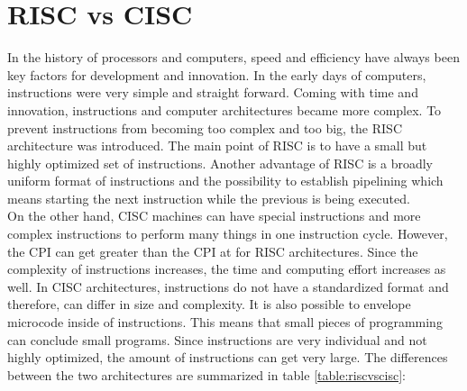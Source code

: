 \section{RISC vs CISC}
In the history of processors and computers, speed and efficiency have always been key factors for development and innovation. In the early days of computers, instructions were very simple and straight forward. Coming with time and innovation, instructions and computer architectures became more complex. To prevent instructions from becoming too complex and too big, the \acf{RISC} architecture was introduced. The main point of RISC is to have a small but highly optimized set of instructions. Another advantage of RISC is a broadly uniform format of instructions and the possibility to establish pipelining which means starting the next instruction while the previous is being executed.\\
On the other hand, \acf{CISC} machines can have special instructions and more complex instructions to perform many things in one instruction cycle. However, the CPI can get greater than the CPI at for RISC architectures. Since the complexity of instructions increases, the time and computing effort increases as well. In CISC architectures, instructions do not have a standardized format and therefore, can differ in size and complexity. It is also possible to envelope microcode inside of instructions. This means that small pieces of programming can conclude small programs. Since instructions are very individual and not highly optimized, the amount of instructions can get very large. The differences between the two architectures are summarized in table \ref{table:riscvscisc}:
\begin{table}[H]
	\setlength\arrayrulewidth{2pt}
	\centering
	\caption{RISC vs CISC \cite{hellmann2013}}
	\label{table:riscvscisc}
\end{table}
\clearpage

